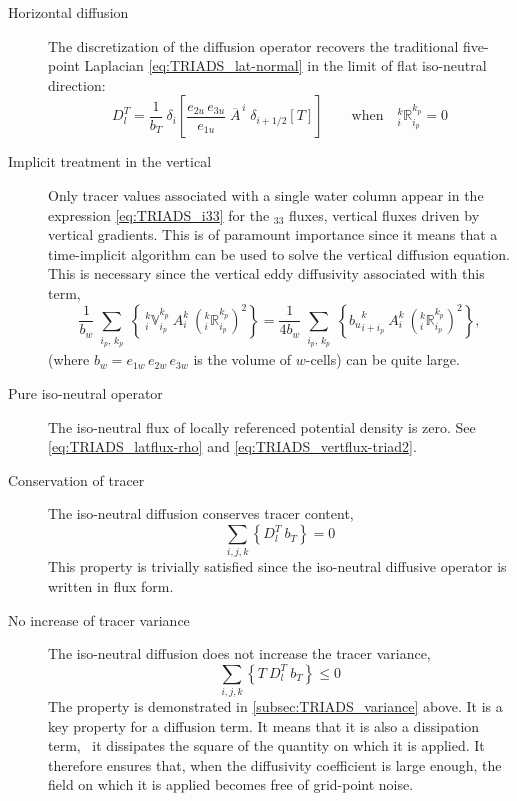 \documentclass[../main/NEMO_manual]{subfiles}
\begin{document}
\begin{description}
\item [Horizontal diffusion] The discretization of the diffusion operator recovers the traditional five-point Laplacian
  \autoref{eq:TRIADS_lat-normal} in the limit of flat iso-neutral direction:
  \[
    D_l^T = \frac{1}{b_T} \
    \delta_{i} \left[ \frac{e_{2u}\,e_{3u}}{e_{1u}} \;
      \overline{A}^{\,i} \; \delta_{i+1/2}[T] \right] \qquad
    \text{when} \quad { _i^k \mathbb{R}_{i_p}^{k_p} }=0
  \]
\item [Implicit treatment in the vertical] Only tracer values associated with a single water column appear in the expression \autoref{eq:TRIADS_i33} for
  the $_{33}$ fluxes, vertical fluxes driven by vertical gradients.
  This is of paramount importance since it means that a time-implicit algorithm can be used to
  solve the vertical diffusion equation.
  This is necessary since the vertical eddy diffusivity associated with this term,
  \[
    \frac{1}{b_w}\sum_{\substack{i_p, \,k_p}} \left\{
      {\:}_i^k\mathbb{V}_{i_p}^{k_p} \: {A}_i^k \: \left(_i^k \mathbb{R}_{i_p}^{k_p}\right)^2
    \right\}  =
    \frac{1}{4b_w}\sum_{\substack{i_p, \,k_p}} \left\{
      {b_u}_{i+i_p}^k\: {A}_i^k \: \left(_i^k \mathbb{R}_{i_p}^{k_p}\right)^2
    \right\},
  \]
  (where $b_w= e_{1w}\,e_{2w}\,e_{3w}$ is the volume of $w$-cells) can be quite large.
\item [Pure iso-neutral operator] The iso-neutral flux of locally referenced potential density is zero.
  See \autoref{eq:TRIADS_latflux-rho} and \autoref{eq:TRIADS_vertflux-triad2}.
\item [Conservation of tracer] The iso-neutral diffusion conserves tracer content, \ie
  \[
    \sum_{i,j,k} \left\{ D_l^T \      b_T \right\} = 0
  \]
  This property is trivially satisfied since the iso-neutral diffusive operator is written in flux form.
\item [No increase of tracer variance] The iso-neutral diffusion does not increase the tracer variance, \ie
  \[
    \sum_{i,j,k} \left\{ T \ D_l^T      \ b_T \right\} \leq 0
  \]
  The property is demonstrated in \autoref{subsec:TRIADS_variance} above.
  It is a key property for a diffusion term.
  It means that it is also a dissipation term,
  \ie\ it dissipates the square of the quantity on which it is applied.
  It therefore ensures that, when the diffusivity coefficient is large enough,
  the field on which it is applied becomes free of grid-point noise.

\end{description}
\end{document}
